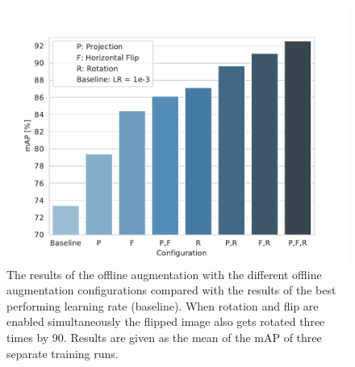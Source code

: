 
\begin{figure}
\begin{center}
    \includegraphics[width=13cm]{imgs/yolo_offline_aug_experiment.pdf}
    \caption{The results of the offline augmentation with the different offline augmentation configurations compared with the results of the best performing learning rate (baseline). When rotation and flip are enabled simultaneously the flipped image also gets rotated three times by 90\textdegree. Results are given as the mean of the mAP of three separate training runs.}
    \label{fig:yolo_offline_aug_results}
\end{center}
\end{figure}

